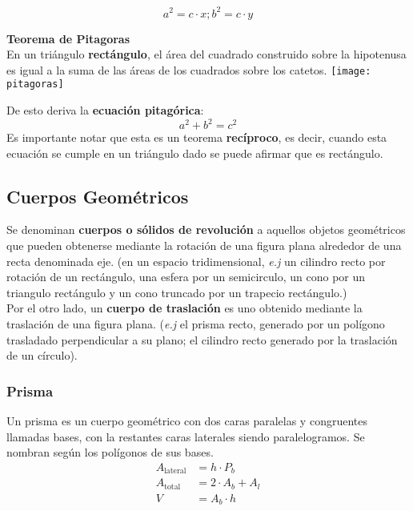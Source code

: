 \begin{equation*}
    a^2 = c \cdot x; b^2 = c \cdot y
\end{equation*}

\textbf{Teorema de Pitagoras}\\
En un triángulo \textbf{rectángulo}, el área del cuadrado construido sobre la hipotenusa es igual a la suma de las áreas de los cuadrados sobre los catetos.
\texttt{[image: pitagoras]}

De esto deriva la \textbf{ecuación pitagórica}:
\begin{equation*}
    a^2 + b^2 = c^2
\end{equation*}
Es importante notar que esta es un teorema \textbf{recíproco}, es decir, cuando esta ecuación se cumple en un triángulo dado se puede afirmar que es rectángulo.\\

\subsection{Cuerpos Geométricos}
Se denominan \textbf{cuerpos o sólidos de revolución} a aquellos objetos geométricos que pueden obtenerse mediante la rotación de una figura plana alrededor de una recta denominada eje. (en un espacio tridimensional, \textit{e.j} un cilindro recto por rotación de un rectángulo, una esfera por un semicirculo, un cono por un triangulo rectángulo y un cono truncado por un trapecio rectángulo.)\\

Por el otro lado, un \textbf{cuerpo de traslación} es uno obtenido mediante la traslación de una figura plana. (\textit{e.j} el prisma recto, generado por un polígono trasladado perpendicular a su plano; el cilindro recto generado por la traslación de un círculo).
\subsubsection{Prisma}
Un prisma es un cuerpo geométrico con dos caras paralelas y congruentes llamadas bases, con la restantes caras laterales siendo paralelogramos. Se nombran según los polígonos de sus bases. \\
\begin{equation*}
    \begin{split} 
    A_{\text{lateral}} &= h \cdot P_b\\
    A_{\text{total}} &= 2\cdot A_b + A_l\\
    V &= A_b\cdot h
    \end{split}
\end{equation*}

